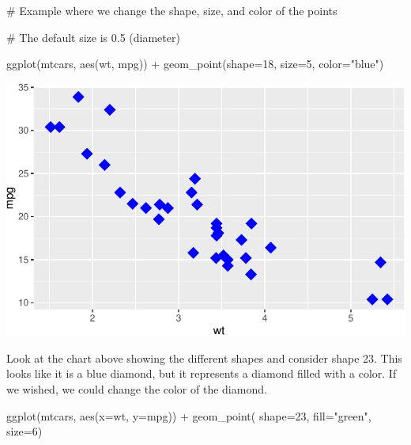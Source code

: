\documentclass[
  letterpaper,
  DIV=11,
  numbers=noendperiod]{scrreprt}
\newenvironment{Shaded}{\begin{snugshade}}{\end{snugshade}}
\newcommand{\AttributeTok}[1]{\textcolor[rgb]{0.40,0.45,0.13}{#1}}
\newcommand{\CommentTok}[1]{\textcolor[rgb]{0.37,0.37,0.37}{#1}}
\newcommand{\DecValTok}[1]{\textcolor[rgb]{0.68,0.00,0.00}{#1}}
\newcommand{\FunctionTok}[1]{\textcolor[rgb]{0.28,0.35,0.67}{#1}}
\newcommand{\NormalTok}[1]{\textcolor[rgb]{0.00,0.23,0.31}{#1}}
\newcommand{\SpecialCharTok}[1]{\textcolor[rgb]{0.37,0.37,0.37}{#1}}
\newcommand{\StringTok}[1]{\textcolor[rgb]{0.13,0.47,0.30}{#1}}
\begin{document}
\begin{Shaded}
\begin{Highlighting}[]
\CommentTok{\# Example where we change the shape, size, and color of the points}

\CommentTok{\# The default size is 0.5 (diameter)}

\FunctionTok{ggplot}\NormalTok{(mtcars, }\FunctionTok{aes}\NormalTok{(wt, mpg)) }\SpecialCharTok{+} 
  \FunctionTok{geom\_point}\NormalTok{(}\AttributeTok{shape=}\DecValTok{18}\NormalTok{, }\AttributeTok{size=}\DecValTok{5}\NormalTok{, }\AttributeTok{color=}\StringTok{"blue"}\NormalTok{)}
\end{Highlighting}
\end{Shaded}

\includegraphics{Advanced_Scatterplot_Techniques_files/figure-pdf/unnamed-chunk-5-1.pdf}

Look at the chart above showing the different shapes and consider shape
23. This looks like it is a blue diamond, but it represents a diamond
filled with a color. If we wished, we could change the color of the
diamond.

\begin{Shaded}
\begin{Highlighting}[]
\FunctionTok{ggplot}\NormalTok{(mtcars, }\FunctionTok{aes}\NormalTok{(}\AttributeTok{x=}\NormalTok{wt, }\AttributeTok{y=}\NormalTok{mpg)) }\SpecialCharTok{+}
  \FunctionTok{geom\_point}\NormalTok{( }\AttributeTok{shape=}\DecValTok{23}\NormalTok{, }\AttributeTok{fill=}\StringTok{"green"}\NormalTok{, }\AttributeTok{size=}\DecValTok{6}\NormalTok{)}
\end{Highlighting}
\end{Shaded}
\end{document}
